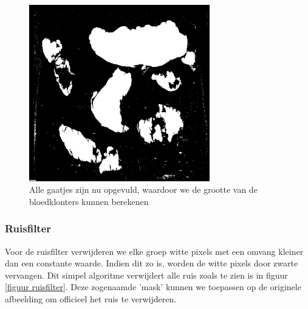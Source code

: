 \documentclass[a4paper,kulak]{kulakarticle}
\begin{document}
\begin{figure}[H]
	\centering
	\includegraphics[width = 0.7\textwidth]{grijswaarden_bin_gevuld_vb}
	
	\caption{Alle gaatjes zijn nu opgevuld, waardoor we de grootte van de bloedklonters kunnen berekenen}
	\label{figuur lok_bloed}
\end{figure}

\subsubsection{Ruisfilter}
Voor de ruisfilter verwijderen we elke groep witte pixels met een omvang kleiner dan een constante waarde. Indien dit zo is, worden de witte pixels door zwarte vervangen. Dit simpel algoritme verwijdert alle ruis zoals te zien is in figuur \ref{figuur ruisfilter}. Deze zogenaamde 'mask' kunnen we toepassen op de originele afbeelding om officieel het ruis te verwijderen.
\end{document}
